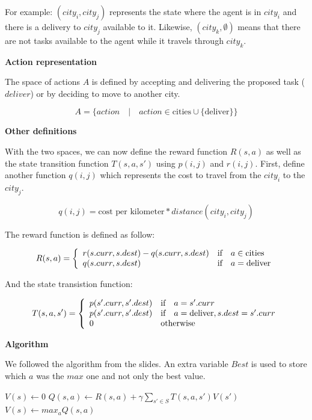 \documentclass[11pt,a4paper]{article}
\begin{document}
For example: $(city_i, city_j)$ represents the state where the agent is
in $city_i$ and there is a delivery to $city_j$ available to it. Likewise,
$(city_k, \emptyset)$ means that there are not tasks available to the agent
while it travels through $city_k$.

\medskip
\textbf{Action representation}

The space of actions $A$ is defined by accepting and delivering the proposed
task ($deliver$) or by deciding to move to another city.

$$ A = \{ action \quad | \quad action \in \text{cities} \cup \{\text{deliver}\} \} $$

\medskip
\textbf{Other definitions}

With the two spaces, we can now define the reward function $R(s,a)$ as well as
the state transition function $T(s,a,s')$ using $p(i,j)$ and $r(i,j)$. First,
define another function $q(i,j)$ which represents the cost to travel from
the $city_i$ to the $city_j$.

$$ q(i, j) = \text{cost per kilometer} * distance(city_i, city_j) $$

The reward function is defined as follow:

$$ R(s, a) = \left\{
    \begin{array}{l l}
        r(s.curr, s.dest) - q(s.curr, s.dest) & \text{if} \quad a \in \text{cities} \\
        q(s.curr, s.dest) & \text{if} \quad a = \text{deliver}
    \end{array} \right. $$

And the state transistion function:


$$ T(s, a, s') = \left\{
    \begin{array}{l l}
        p(s'.curr, s'.dest) & \text{if} \quad a = s'.curr \\
        p(s'.curr, s'.dest) & \text{if} \quad a = \text{deliver}, s.dest = s'.curr \\
        0 & \text{otherwise}
    \end{array} \right. $$

\medskip
\textbf{Algorithm}

We followed the algorithm from the slides. An extra variable $ Best$ is used to
store which $a$ was the $max$ one and not only the best value.

\begin{algorithmic}
            \State $V(s) \gets 0$
        \EndFor
                    $Q(s, a) \gets R(s, a) + \gamma \sum_{s' \in S} T(s,a,s') V(s')$
                \EndFor
            $V(s) \gets max_aQ(s, a)$
            \EndFor
        \EndWhile
    \EndFunction
\end{algorithmic}
\end{document}

